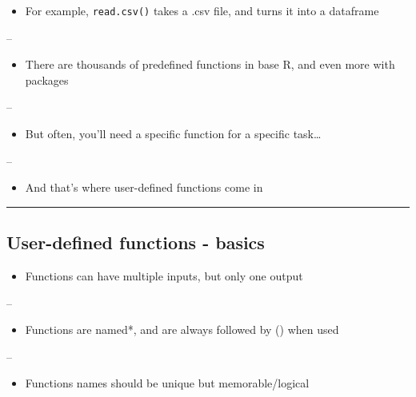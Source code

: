 \documentclass[]{article}
\providecommand{\tightlist}{%
  \setlength{\itemsep}{0pt}\setlength{\parskip}{0pt}}
\begin{document}
\begin{itemize}
\tightlist
\item
  For example, \texttt{read.csv()} takes a .csv file, and turns it into
  a dataframe
\end{itemize}

--

\begin{itemize}
\tightlist
\item
  There are thousands of predefined functions in base R, and even more
  with packages
\end{itemize}

--

\begin{itemize}
\tightlist
\item
  But often, you'll need a specific function for a specific task\ldots{}
\end{itemize}

--

\begin{itemize}
\tightlist
\item
  And that's where user-defined functions come in
\end{itemize}

\begin{center}\rule{0.5\linewidth}{\linethickness}\end{center}

\hypertarget{user-defined-functions---basics}{%
\subsection{User-defined functions -
basics}\label{user-defined-functions---basics}}

\begin{itemize}
\tightlist
\item
  Functions can have multiple inputs, but only one output
\end{itemize}

--

\begin{itemize}
\tightlist
\item
  Functions are named*, and are always followed by () when used
\end{itemize}

--

\begin{itemize}
\tightlist
\item
  Functions names should be unique but memorable/logical
\end{itemize}
\end{document}
